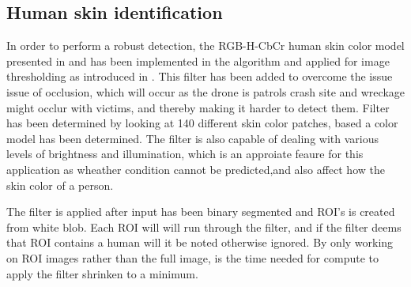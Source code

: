 \subsection{Human skin identification}
In order to perform a robust detection, the RGB-H-CbCr human skin color model presented in \cite{Ref:SkinColorModel} and \cite{Ref:SkinDetection} has been implemented in the algorithm and applied for image thresholding as introduced in \cite{Ref:SkinDetection}. This filter has been added to overcome the issue issue of occlusion, which will occur as the drone is patrols crash site and wreckage might occlur with victims, and thereby making it harder to detect them. Filter has been determined by looking at 140 different skin color patches, based a color model has been determined. The filter is also capable of dealing with various levels of brightness and illumination, which is an approiate feaure for this application as wheather condition cannot be predicted,and also affect how the skin color of a person. 


The filter is applied after input has been binary segmented and  ROI's is created from white blob. Each ROI will will run through the filter, and if the filter deems that ROI contains a human will it be noted otherwise ignored.  By only working on ROI images rather than the full image, is the time needed for compute to apply the filter shrinken to a minimum. 




